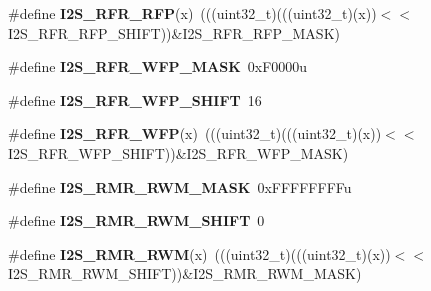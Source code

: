\begin{DoxyCompactItemize}
\item 
\#define {\bfseries I2\+S\+\_\+\+R\+F\+R\+\_\+\+R\+FP}(x)~(((uint32\+\_\+t)(((uint32\+\_\+t)(x))$<$$<$I2\+S\+\_\+\+R\+F\+R\+\_\+\+R\+F\+P\+\_\+\+S\+H\+I\+FT))\&I2\+S\+\_\+\+R\+F\+R\+\_\+\+R\+F\+P\+\_\+\+M\+A\+SK)\hypertarget{group__I2S__Register__Masks_ga48f5461338aaab9b151fa6e7272f3cdb}{}\label{group__I2S__Register__Masks_ga48f5461338aaab9b151fa6e7272f3cdb}

\item 
\#define {\bfseries I2\+S\+\_\+\+R\+F\+R\+\_\+\+W\+F\+P\+\_\+\+M\+A\+SK}~0x\+F0000u\hypertarget{group__I2S__Register__Masks_ga14ca8fb387a14c562c2721c054f25acc}{}\label{group__I2S__Register__Masks_ga14ca8fb387a14c562c2721c054f25acc}

\item 
\#define {\bfseries I2\+S\+\_\+\+R\+F\+R\+\_\+\+W\+F\+P\+\_\+\+S\+H\+I\+FT}~16\hypertarget{group__I2S__Register__Masks_ga1890bc961298234e8516b19b4523bfb5}{}\label{group__I2S__Register__Masks_ga1890bc961298234e8516b19b4523bfb5}

\item 
\#define {\bfseries I2\+S\+\_\+\+R\+F\+R\+\_\+\+W\+FP}(x)~(((uint32\+\_\+t)(((uint32\+\_\+t)(x))$<$$<$I2\+S\+\_\+\+R\+F\+R\+\_\+\+W\+F\+P\+\_\+\+S\+H\+I\+FT))\&I2\+S\+\_\+\+R\+F\+R\+\_\+\+W\+F\+P\+\_\+\+M\+A\+SK)\hypertarget{group__I2S__Register__Masks_ga9f424cc6a0d2f577d7356b4abb83e43c}{}\label{group__I2S__Register__Masks_ga9f424cc6a0d2f577d7356b4abb83e43c}

\item 
\#define {\bfseries I2\+S\+\_\+\+R\+M\+R\+\_\+\+R\+W\+M\+\_\+\+M\+A\+SK}~0x\+F\+F\+F\+F\+F\+F\+F\+Fu\hypertarget{group__I2S__Register__Masks_ga72f2c1e6c8be00aa0227c8d924c3506a}{}\label{group__I2S__Register__Masks_ga72f2c1e6c8be00aa0227c8d924c3506a}

\item 
\#define {\bfseries I2\+S\+\_\+\+R\+M\+R\+\_\+\+R\+W\+M\+\_\+\+S\+H\+I\+FT}~0\hypertarget{group__I2S__Register__Masks_gaf69010ae59c583206d59a8cc0c681c04}{}\label{group__I2S__Register__Masks_gaf69010ae59c583206d59a8cc0c681c04}

\item 
\#define {\bfseries I2\+S\+\_\+\+R\+M\+R\+\_\+\+R\+WM}(x)~(((uint32\+\_\+t)(((uint32\+\_\+t)(x))$<$$<$I2\+S\+\_\+\+R\+M\+R\+\_\+\+R\+W\+M\+\_\+\+S\+H\+I\+FT))\&I2\+S\+\_\+\+R\+M\+R\+\_\+\+R\+W\+M\+\_\+\+M\+A\+SK)\hypertarget{group__I2S__Register__Masks_ga7c42aae38ae5b259cf5def11533ba076}{}\label{group__I2S__Register__Masks_ga7c42aae38ae5b259cf5def11533ba076}


\end{DoxyCompactItemize}
